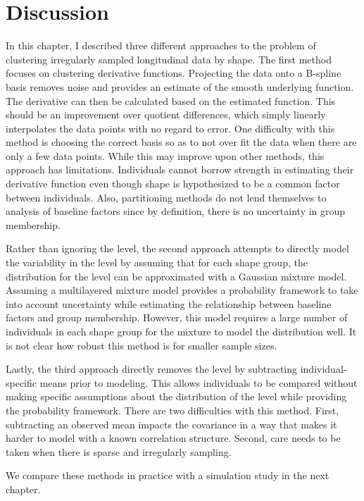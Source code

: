 \section{Discussion}
In this chapter, I described three different approaches to the problem of clustering irregularly sampled longitudinal data by shape. The first method focuses on clustering derivative functions. Projecting the data onto a B-spline basis removes noise and provides an estimate of the smooth underlying function. The derivative can then be calculated based on the estimated function. This should be an improvement over quotient differences, which simply linearly interpolates the data points with no regard to error. One difficulty with this method is choosing the correct basis so as to not over fit the data when there are only a few data points. While this may improve upon other methods, this approach has limitations. Individuals cannot borrow strength in estimating their derivative function even though shape is hypothesized to be a common factor between individuals. Also, partitioning methods do not lend themselves to analysis of baseline factors since by definition, there is no uncertainty in group membership.  

Rather than ignoring the level, the second approach attempts to directly model the variability in the level by assuming that for each shape group, the distribution for the level can be approximated with a Gaussian mixture model. Assuming a multilayered mixture model provides a probability framework to take into account uncertainty while estimating the relationship between baseline factors and group membership. However, this model requires a large number of individuals in each shape group for the mixture to model the distribution well. It is not clear how robust this method is for smaller sample sizes.

Lastly, the third approach directly removes the level by subtracting individual-specific means prior to modeling. This allows individuals to be compared without making specific assumptions about the distribution of the level while providing the probability framework.  There are two difficulties with this method. First, subtracting an observed mean impacts the covariance in a way that makes it harder to model with a known correlation structure. Second, care needs to be taken when there is sparse and irregularly sampling. 

We compare these methods in practice with a simulation study in the next chapter.
